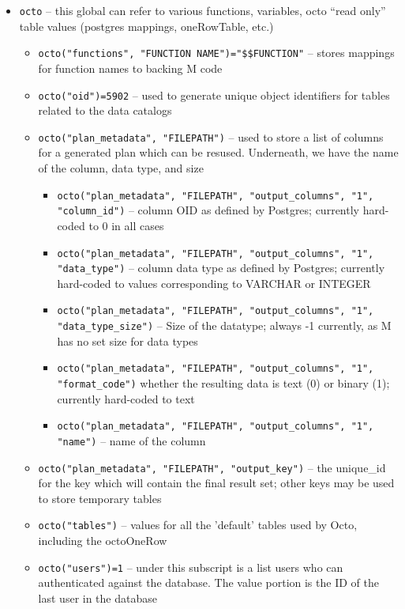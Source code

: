 \documentclass[]{article}
\def\code#1{\texttt{#1}}
\begin{document}
\begin{itemize}
	\item \code{octo} -- this global can refer to various functions, variables, octo “read only” table values (postgres mappings, oneRowTable, etc.)
	\begin{itemize}
		\item \code{octo("functions", "FUNCTION NAME")="\$\$FUNCTION"} -- stores mappings for function names to backing M code
		\item \code{octo("oid")=5902} -- used to generate unique object identifiers for tables related to the data catalogs
		\item \code{octo("plan\_metadata", "FILEPATH")} -- used to store a list of columns for a generated plan which can be resused. Underneath, we have the name of the column, data type, and size
		\begin{itemize}
			\item \code{octo("plan\_metadata", "FILEPATH", "output\_columns", "1", "column\_id")} -- column OID as defined by Postgres; currently hard-coded to 0 in all cases
			\item \code{octo("plan\_metadata", "FILEPATH", "output\_columns", "1", "data\_type")} -- column data type as defined by Postgres; currently hard-coded to values corresponding to VARCHAR or INTEGER
			\item \code{octo("plan\_metadata", "FILEPATH", "output\_columns", "1", "data\_type\_size")} -- Size of the datatype; always -1 currently, as M has no set size for data types
			\item \code{octo("plan\_metadata", "FILEPATH", "output\_columns", "1", "format\_code")} whether the resulting data is text (0) or binary (1); currently hard-coded to text
			\item \code{octo("plan\_metadata", "FILEPATH", "output\_columns", "1", "name")} -- name of the column
		\end{itemize}
		\item \code{octo("plan\_metadata", "FILEPATH", "output\_key")} -- the unique\_id for the key which will contain the final result set; other keys may be used to store temporary tables
		\item \code{octo("tables")} -- values for all the 'default' tables used by Octo, including the octoOneRow
		\item \code{octo("users")=1} -- under this subscript is a list users who can authenticated against the database. The value portion is the ID of the last user in the database
		\begin{itemize}

\end{itemize}
\end{itemize}
\end{itemize}
\end{document}
